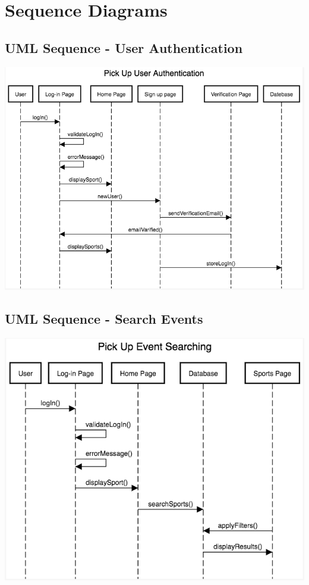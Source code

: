 \documentclass[a4paper]{article}
\begin{document}
\section{Sequence Diagrams}
\subsection{UML Sequence - User Authentication}
\includegraphics[width=\textwidth]{images/uml1.png}

\subsection{UML Sequence - Search Events}
\includegraphics[width=\textwidth]{images/uml2.png}
\end{document}
